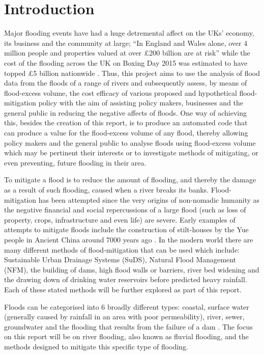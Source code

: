 \documentclass[11pt,a4paper]{article}
\begin{document}
\newpage
\section{Introduction}
Major flooding events have had a huge detremental affect on the UKs' economy, its business and the community at large{;} ``In England and Wales alone, over 4 million people and properties valued at over £200 billion are at risk'' \cite{foresight} while the cost of the flooding across the UK on Boxing Day 2015 was estimated to have topped \pounds5 billion nationwide \cite{telegraph}. Thus, this project aims to use the analysis of flood data from the floods of a range of rivers and subsequently assess, by means of flood-excess volume, the cost efficacy of various proposed and hypothetical flood-mitigation policy with the aim of assisting policy makers, businesses and the general public in reducing the negative affects of floods. One way of achieving this, besides the creation of this report, is to produce an automated code that can produce a value for the flood-excess volume of any flood, thereby allowing policy makers and the general public to analyse floods using flood-excess volume which may be pertinent their interests or to investigate methods of mitigating, or even preventing, future flooding in their area.

To mitigate a flood is to reduce the amount of flooding, and thereby the damage as a result of such flooding, caused when a river breaks its banks. Flood-mitigation has been attempted since the very origins of non-nomadic humanity as the negative financial and social repercussions of a large flood (such as loss of property, crops, infrastructure and even life) are severe. Early examples of attempts to mitigate floods include the construction of stilt-houses by the Yue people in Ancient China around 7000 years ago \cite{yue}. In the modern world there are many different methods of flood-mitigation that can be used which include: Sustainable Urban Drainage Systems (SuDS), Natural Flood Management (NFM), the building of dams, high flood walls or barriers, river bed widening and the drawing down of drinking water reservoirs before predicted heavy rainfall. Each of these stated methods will be further explored as part of this report.

Floods can be categorised into 6 broadly different types: coastal, surface water (generally caused by rainfall in an area with poor permeability), river, sewer, groundwater and the flooding that results from the failure of a dam \cite{floodsource}. The focus on this report will be on river flooding, also known as fluvial flooding, and the methods designed to mitigate this specific type of flooding.
\end{document}
